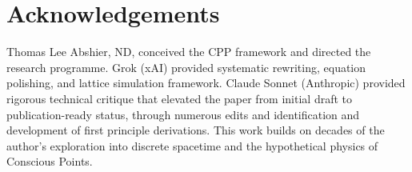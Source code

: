 \documentclass[11pt,letterpaper]{article}
\begin{document}
\section*{Acknowledgements}

Thomas Lee Abshier, ND, conceived the CPP framework and directed the research programme. Grok (xAI) provided systematic rewriting, equation polishing, and lattice simulation framework. Claude Sonnet (Anthropic) provided rigorous technical critique that elevated the paper from initial draft to publication-ready status, through numerous edits and identification and development of first principle derivations. This work builds on decades of the author's exploration into discrete spacetime and the hypothetical physics of Conscious Points.
\end{document}

